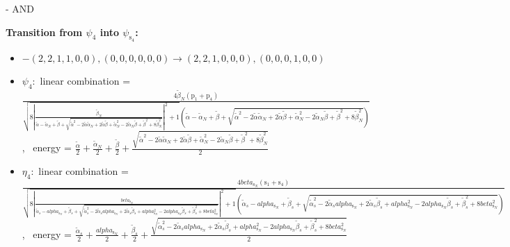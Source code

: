 \documentclass[12pt,a4paper]{article}
\begin{document}
 -  AND 

        \noindent\textbf{Transition from $\psi_{4}$ into $\psi_{\text{s}_{4}}$:}
        \begin{itemize}
            \item $- (2, 2, 1, 1, 0, 0), (0, 0, 0, 0, 0, 0) \rightarrow (2, 2, 1, 0, 0, 0), (0, 0, 0, 1, 0, 0)$
        
            \item $\psi_{4}:$ linear combination = $\frac{4 \tilde{\beta}_{N} \left(\text{p}_{1} + \text{p}_{4}\right)}{\sqrt{8 \left|{\frac{\tilde{\beta}_{N}}{\tilde{\alpha} - \tilde{\alpha}_{N} + \tilde{\beta} + \sqrt{\tilde{\alpha}^{2} - 2 \tilde{\alpha} \tilde{\alpha}_{N} + 2 \tilde{\alpha} \tilde{\beta} + \tilde{\alpha}_{N}^{2} - 2 \tilde{\alpha}_{N} \tilde{\beta} + \tilde{\beta}^{2} + 8 \tilde{\beta}_{N}^{2}}}}\right|^{2} + 1} \left(\tilde{\alpha} - \tilde{\alpha}_{N} + \tilde{\beta} + \sqrt{\tilde{\alpha}^{2} - 2 \tilde{\alpha} \tilde{\alpha}_{N} + 2 \tilde{\alpha} \tilde{\beta} + \tilde{\alpha}_{N}^{2} - 2 \tilde{\alpha}_{N} \tilde{\beta} + \tilde{\beta}^{2} + 8 \tilde{\beta}_{N}^{2}}\right)}$, \
            energy = $\frac{\tilde{\alpha}}{2} + \frac{\tilde{\alpha}_{N}}{2} + \frac{\tilde{\beta}}{2} + \frac{\sqrt{\tilde{\alpha}^{2} - 2 \tilde{\alpha} \tilde{\alpha}_{N} + 2 \tilde{\alpha} \tilde{\beta} + \tilde{\alpha}_{N}^{2} - 2 \tilde{\alpha}_{N} \tilde{\beta} + \tilde{\beta}^{2} + 8 \tilde{\beta}_{N}^{2}}}{2}$
            
            \item $\eta_{4}:$ linear combination = $\frac{4 beta_{\text{s}_N} \left(\text{s}_{1} + \text{s}_{4}\right)}{\sqrt{8 \left|{\frac{beta_{\text{s}_N}}{\tilde{\alpha}_{s} - alpha_{\text{s}_N} + \tilde{\beta}_{s} + \sqrt{\tilde{\alpha}_{s}^{2} - 2 \tilde{\alpha}_{s} alpha_{\text{s}_N} + 2 \tilde{\alpha}_{s} \tilde{\beta}_{s} + alpha_{\text{s}_N}^{2} - 2 alpha_{\text{s}_N} \tilde{\beta}_{s} + \tilde{\beta}_{s}^{2} + 8 beta_{\text{s}_N}^{2}}}}\right|^{2} + 1} \left(\tilde{\alpha}_{s} - alpha_{\text{s}_N} + \tilde{\beta}_{s} + \sqrt{\tilde{\alpha}_{s}^{2} - 2 \tilde{\alpha}_{s} alpha_{\text{s}_N} + 2 \tilde{\alpha}_{s} \tilde{\beta}_{s} + alpha_{\text{s}_N}^{2} - 2 alpha_{\text{s}_N} \tilde{\beta}_{s} + \tilde{\beta}_{s}^{2} + 8 beta_{\text{s}_N}^{2}}\right)}$, \
            energy = $\frac{\tilde{\alpha}_{s}}{2} + \frac{alpha_{\text{s}_N}}{2} + \frac{\tilde{\beta}_{s}}{2} + \frac{\sqrt{\tilde{\alpha}_{s}^{2} - 2 \tilde{\alpha}_{s} alpha_{\text{s}_N} + 2 \tilde{\alpha}_{s} \tilde{\beta}_{s} + alpha_{\text{s}_N}^{2} - 2 alpha_{\text{s}_N} \tilde{\beta}_{s} + \tilde{\beta}_{s}^{2} + 8 beta_{\text{s}_N}^{2}}}{2}$
            

\end{itemize}
\end{document}

